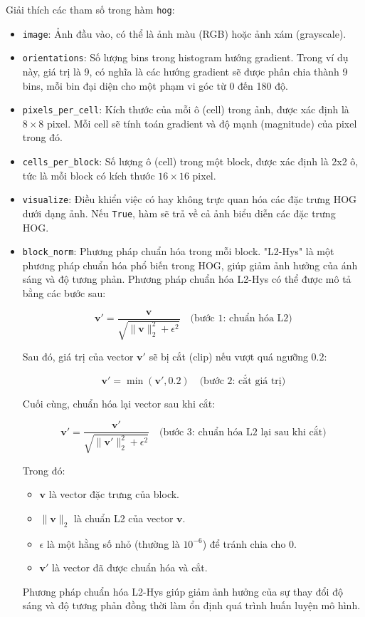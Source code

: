 \documentclass[a4paper,12pt]{article}
\begin{document}
\noindent Giải thích các tham số trong hàm \texttt{hog}:
\begin{itemize}
    \item \texttt{image}: Ảnh đầu vào, có thể là ảnh màu (RGB) hoặc ảnh xám (grayscale).
    \item \texttt{orientations}: Số lượng bins trong histogram hướng gradient. Trong ví dụ này, giá trị là 9, có nghĩa là các hướng gradient sẽ được phân chia thành 9 bins, mỗi bin đại diện cho một phạm vi góc từ 0 đến 180 độ.
    \item \texttt{pixels\_per\_cell}: Kích thước của mỗi ô (cell) trong ảnh, được xác định là \(8 \times 8\) pixel. Mỗi cell sẽ tính toán gradient và độ mạnh (magnitude) của pixel trong đó.
    \item \texttt{cells\_per\_block}: Số lượng ô (cell) trong một block, được xác định là 2x2 ô, tức là mỗi block có kích thước \(16 \times 16\) pixel.
    \item \texttt{visualize}: Điều khiển việc có hay không trực quan hóa các đặc trưng HOG dưới dạng ảnh. Nếu \texttt{True}, hàm sẽ trả về cả ảnh biểu diễn các đặc trưng HOG.
    \item \texttt{block\_norm}: Phương pháp chuẩn hóa trong mỗi block. "L2-Hys" là một phương pháp chuẩn hóa phổ biến trong HOG, giúp giảm ảnh hưởng của ánh sáng và độ tương phản. Phương pháp chuẩn hóa L2-Hys \cite{hog_l2_norm} có thể được mô tả bằng các bước sau:

    \[
    \mathbf{v'} = \frac{\mathbf{v}}{\sqrt{\|\mathbf{v}\|_2^2 + \epsilon^2}} \quad \text{(bước 1: chuẩn hóa L2)}
    \]

    Sau đó, giá trị của vector \(\mathbf{v'}\) sẽ bị cắt (clip) nếu vượt quá ngưỡng \(0.2\):

    \[
    \mathbf{v'} = \min(\mathbf{v'}, 0.2) \quad \text{(bước 2: cắt giá trị)}
    \]

    Cuối cùng, chuẩn hóa lại vector sau khi cắt:

    \[
    \mathbf{v'} = \frac{\mathbf{v'}}{\sqrt{\|\mathbf{v'}\|_2^2 + \epsilon^2}} \quad \text{(bước 3: chuẩn hóa L2 lại sau khi cắt)}
    \]

    Trong đó:
    \begin{itemize}
        \item \(\mathbf{v}\) là vector đặc trưng của block.
        \item \(\|\mathbf{v}\|_2\) là chuẩn L2 của vector \(\mathbf{v}\).
        \item \(\epsilon\) là một hằng số nhỏ (thường là \(10^{-6}\)) để tránh chia cho 0.
        \item \(\mathbf{v'}\) là vector đã được chuẩn hóa và cắt.
    \end{itemize}
    Phương pháp chuẩn hóa L2-Hys giúp giảm ảnh hưởng của sự thay đổi độ sáng và độ tương phản đồng thời làm ổn định quá trình huấn luyện mô hình.
    

\end{itemize}
\end{document}
